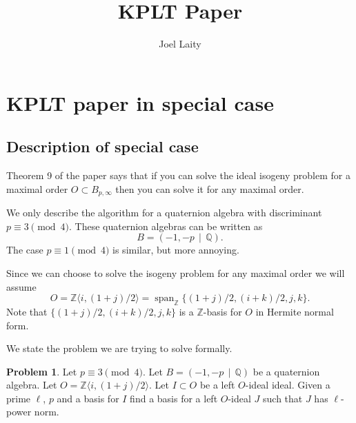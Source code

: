 \documentclass[10pt]{article}
\title{KPLT Paper}
\author{Joel Laity}
\theoremstyle{plain}
\theoremstyle{definition}
\newtheorem{problem}[theorem]{Problem}
\newcommand{\op}{\operatorname}
\newcommand{\Z}{\mathbb{Z}}
\newcommand{\Q}{\mathbb{Q}}
\begin{document}
\maketitle
\tableofcontents


\section{KPLT paper in special case}
\subsection{Description of special case}

Theorem 9 of the paper says that if you can solve the ideal isogeny problem for a maximal order \( O \subset B_{p, \infty} \) then you can solve it for any  maximal order.


We only describe the algorithm for a quaternion algebra with discriminant \( p \equiv 3 \pmod{4} \).
These quaternion algebras can be written as
\[
    B = (-1, -p \, \mid \, \Q).
\]
The case \( p \equiv 1 \pmod{4} \) is similar, but more annoying.

Since we can choose to solve the isogeny problem for any maximal order we will assume
\[
    O = \Z \langle i, (1+j) / 2 \rangle = \op{span}_\Z \{ (1+j) / 2, (i+k) / 2 , j, k \}.
\]
Note that \( \{ (1+j) / 2, (i+k) / 2 , j, k \} \) is a \( \Z \)-basis for \( O \) in Hermite normal form.

We state the problem we are trying to solve formally.

\begin{problem} \label{prob: general}
Let \( p \equiv 3 \pmod{4} \).
Let \( B =  (-1, -p \, \mid \, \Q) \) be a quaternion algebra.
Let \( O = \Z \langle i, (1+j) / 2 \rangle \).
Let \( I \subset O \) be a left \( O \)-ideal ideal.
Given a prime \( \ell \), \( p \) and a basis for \( I \) find a basis for a left \( O \)-ideal \( J \) such that \( J \) has \( \ell \)-power norm.
\end{problem}
\end{document}
